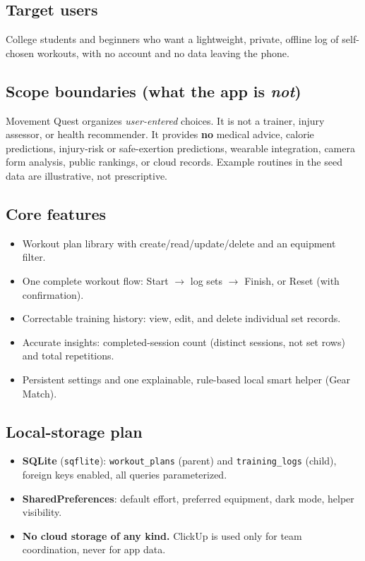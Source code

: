 \documentclass[11pt]{article}
\begin{document}
\subsection*{Target users}
College students and beginners who want a lightweight, private, offline log of self-chosen workouts, with no account and no data leaving the phone.

\subsection*{Scope boundaries (what the app is \emph{not})}
Movement Quest organizes \emph{user-entered} choices. It is not a trainer, injury assessor, or health recommender. It provides \textbf{no} medical advice, calorie predictions, injury-risk or safe-exertion predictions, wearable integration, camera form analysis, public rankings, or cloud records. Example routines in the seed data are illustrative, not prescriptive.

\subsection*{Core features}
\begin{itemize}
  \item Workout plan library with create/read/update/delete and an equipment filter.
  \item One complete workout flow: Start $\rightarrow$ log sets $\rightarrow$ Finish, or Reset (with confirmation).
  \item Correctable training history: view, edit, and delete individual set records.
  \item Accurate insights: completed-session count (distinct sessions, not set rows) and total repetitions.
  \item Persistent settings and one explainable, rule-based local smart helper (Gear Match).
\end{itemize}

\subsection*{Local-storage plan}
\begin{itemize}
  \item \textbf{SQLite} (\texttt{sqflite}): \texttt{workout\_plans} (parent) and \texttt{training\_logs} (child), foreign keys enabled, all queries parameterized.
  \item \textbf{SharedPreferences}: default effort, preferred equipment, dark mode, helper visibility.
  \item \textbf{No cloud storage of any kind.} ClickUp is used only for team coordination, never for app data.
\end{itemize}
\end{document}
